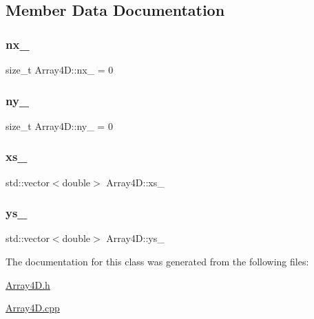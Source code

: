 \subsection{Member Data Documentation}
\mbox{\label{class_array4_d_a5fa707d43fe236f8890dae010de99bf1}} 
\subsubsection{\texorpdfstring{nx\+\_\+}{nx\_}}
{\footnotesize\ttfamily size\+\_\+t Array4\+D\+::nx\+\_\+ = 0\hspace{0.3cm}{\ttfamily [protected]}}

\mbox{\label{class_array4_d_a0c3053b1362730bb52d2d6e9c4402099}} 
\subsubsection{\texorpdfstring{ny\+\_\+}{ny\_}}
{\footnotesize\ttfamily size\+\_\+t Array4\+D\+::ny\+\_\+ = 0\hspace{0.3cm}{\ttfamily [protected]}}

\mbox{\label{class_array4_d_a6fdbbc14cbe18e25f68ec9773df18783}} 
\subsubsection{\texorpdfstring{xs\+\_\+}{xs\_}}
{\footnotesize\ttfamily std\+::vector$<$double$>$ Array4\+D\+::xs\+\_\+\hspace{0.3cm}{\ttfamily [protected]}}

\mbox{\label{class_array4_d_aa9277734c8de6f2a02e6b06ccccbdaad}} 
\subsubsection{\texorpdfstring{ys\+\_\+}{ys\_}}
{\footnotesize\ttfamily std\+::vector$<$double$>$ Array4\+D\+::ys\+\_\+\hspace{0.3cm}{\ttfamily [protected]}}



The documentation for this class was generated from the following files\+:\begin{DoxyCompactItemize}
\item 
\mbox{\hyperlink{_array4_d_8h}{Array4\+D.\+h}}\item 
\mbox{\hyperlink{_array4_d_8cpp}{Array4\+D.\+cpp}}\end{DoxyCompactItemize}
